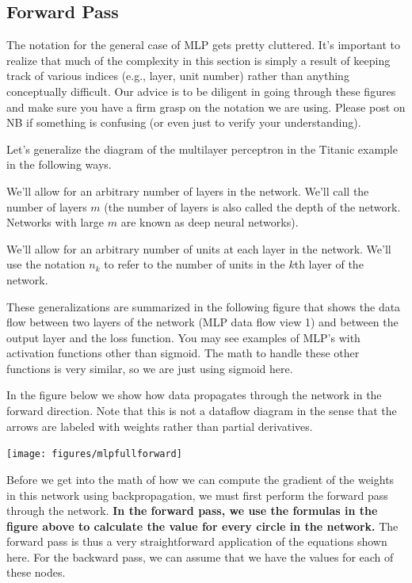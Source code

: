 \documentclass[assignment06_Solutions]{subfiles}
\begin{document}
\subsection{Forward Pass}
\begin{notice}
The notation for the general case of MLP gets pretty cluttered. It's important to realize that much of the complexity in this section is simply a result of keeping track of various indices (e.g., layer, unit number) rather than anything conceptually difficult.  Our advice is to be diligent in going through these figures and make sure you have a firm grasp on the notation we are using.  Please post on NB if something is confusing (or even just to verify your understanding).
\end{notice}

Let's generalize the diagram of the multilayer perceptron in the Titanic example in the following ways.
\be
\item We'll allow for an arbitrary number of layers in the network.  We'll call the number of layers $m$ (the number of layers is also called the depth of the network.  Networks with large $m$ are known as deep neural networks).
\item We'll allow for an arbitrary number of units at each layer in the network.  We'll use the notation $n_k$ to refer to the number of units in the $k$th layer of the network.
\ee

These generalizations are summarized in the following figure that shows the data flow between two layers of the network (MLP data flow view 1) and between the output layer and the loss function.  You may see examples of MLP's with activation functions other than sigmoid.  The math to handle these other functions is very similar, so we are just using sigmoid here.

In the figure below we show how data propagates through the network in the forward direction.  Note that this is not a dataflow diagram in the sense that the arrows are labeled with weights rather than partial derivatives.

\texttt{[image: figures/mlpfullforward]}

Before we get into the math of how we can compute the gradient of the weights in this network using backpropagation, we must first perform the forward pass through the network.  \textbf{In the forward pass, we use the formulas in the figure above to calculate the value for every circle in the network.}  The forward pass is thus a very straightforward application of the equations shown here.  For the backward pass, we can assume that we have the values for each of these nodes.
\end{document}
